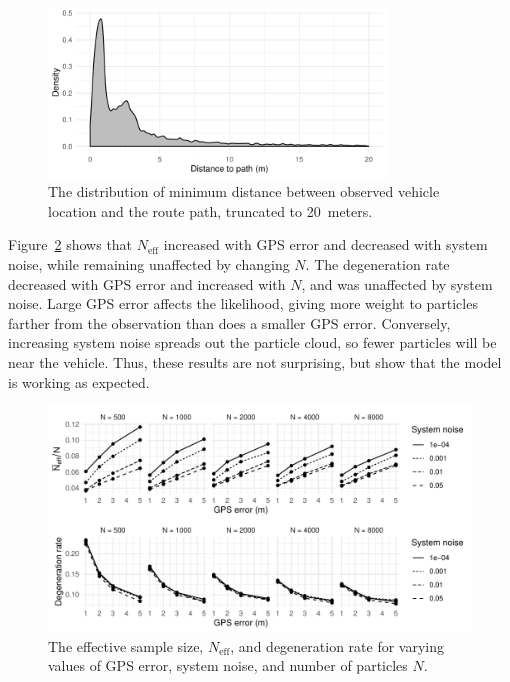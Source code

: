 \begin{figure}[tb]
    \centering
    \includegraphics[width=0.8\textwidth]{figures/04_model_results_dist.pdf}
    \caption{
        The distribution of minimum distance between observed vehicle location
        and the route path, truncated to 20~meters.
    }
    \label{fig:dist_to_route}
\end{figure}


Figure~\ref{fig:perf_stats} shows that $N_\text{eff}$ increased
with GPS error and decreased with system noise,
while remaining unaffected by changing $N$.
The degeneration rate decreased with GPS error and increased with $N$,
and was unaffected by system noise.
Large GPS error affects the likelihood,
giving more weight to particles farther from the observation
than does a smaller GPS error.
Conversely, increasing system noise spreads out the particle cloud,
so fewer particles will be near the vehicle.
Thus, these results are not surprising, 
but show that the model is working as expected.


\begin{figure}[tb]
    \centering
    \includegraphics[width=\textwidth]{figures/04_model_results_neff.pdf}
    \caption{
        The effective sample size, $N_\text{eff}$,
        and degeneration rate for varying values of GPS error,
        system noise, and number of particles $N$.
    }
    \label{fig:perf_stats}
\end{figure}

